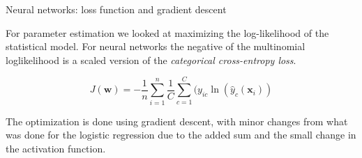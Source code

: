 \documentclass[10pt,ignorenonframetext,]{beamer}
\begin{document}
\begin{frame}

\begin{block}{Neural networks: loss function and gradient descent}

For parameter estimation we looked at maximizing the log-likelihood of
the statistical model. For neural networks the negative of the
multinomial loglikelihood is a scaled version of the \emph{categorical
cross-entropy loss}.

\[ J({\boldsymbol w})=-\frac{1}{n}\sum_{i=1}^n\frac{1}{C} \sum_{c=1}^C (y_{ic}\ln({\hat{y}_c({\boldsymbol x}_i)})\]

The optimization is done using gradient descent, with minor changes from
what was done for the logistic regression due to the added sum and the
small change in the activation function.

\end{block}

\end{frame}
\end{document}

